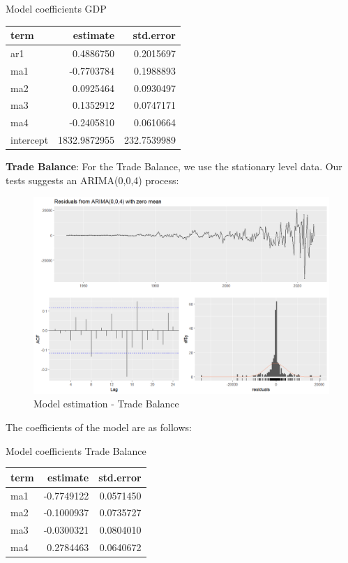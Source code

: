 \documentclass[
]{article}
\begin{document}
\bgroup \table[H]
\centering
\caption{\label{tab:unnamed-chunk-9}Model coefficients GDP}
\centering
\begin{tabular}[t]{lrr}
\toprule
term & estimate & std.error\\
\midrule
ar1 & 0.4886750 & 0.2015697\\
ma1 & -0.7703784 & 0.1988893\\
ma2 & 0.0925464 & 0.0930497\\
ma3 & 0.1352912 & 0.0747171\\
ma4 & -0.2405810 & 0.0610664\\
\addlinespace
intercept & 1832.9872955 & 232.7539989\\
\bottomrule
\end{tabular}
\endtable\egroup

\textbf{Trade Balance}: For the Trade Balance, we use the stationary
level data. Our tests suggests an ARIMA(0,0,4) process:

\begin{figure}

{\centering \includegraphics[width=0.8\linewidth]{../results/Trade Balance_residuals} 

}

\caption{Model estimation - Trade Balance}\label{fig:unnamed-chunk-10}
\end{figure}

The coefficients of the model are as follows:

\bgroup \table[H]
\centering
\caption{\label{tab:unnamed-chunk-11}Model coefficients Trade Balance}
\centering
\begin{tabular}[t]{lrr}
\toprule
term & estimate & std.error\\
\midrule
ma1 & -0.7749122 & 0.0571450\\
ma2 & -0.1000937 & 0.0735727\\
ma3 & -0.0300321 & 0.0804010\\
ma4 & 0.2784463 & 0.0640672\\
\bottomrule
\end{tabular}
\endtable\egroup
\end{document}
